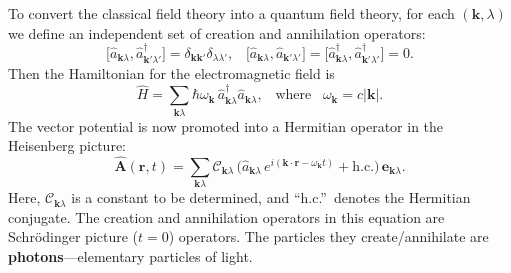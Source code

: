 \documentclass[pra,12pt]{revtex4}
\begin{document}
To convert the classical field theory into a quantum field theory, for
each $(\mathbf{k},\lambda)$ we define an independent set of creation
and annihilation operators:
\begin{equation}
  \big[\hat{a}_{\mathbf{k}\lambda}, \hat{a}_{\mathbf{k}'\lambda'}^\dagger\big]
  = \delta_{\mathbf{k}\mathbf{k}'} \delta_{\lambda\lambda'}, \;\;\;
  \big[\hat{a}_{\mathbf{k}\lambda}, \hat{a}_{\mathbf{k}'\lambda'}\big]
  = \big[\hat{a}_{\mathbf{k}\lambda}^\dagger, \hat{a}_{\mathbf{k}'\lambda'}^\dagger\big]
  = 0.
\end{equation}
Then the Hamiltonian for the electromagnetic field is
\begin{equation}
  \hat{H} = \sum_{\mathbf{k}\lambda} \hbar \omega_{\mathbf{k}} \,
  \hat{a}^\dagger_{\mathbf{k}\lambda} \hat{a}_{\mathbf{k}\lambda},
  \;\;\; \mathrm{where}
  \;\;\;\omega_{\mathbf{k}} = c|\mathbf{k}|.
\end{equation}
The vector potential is now promoted into a Hermitian operator in the
Heisenberg picture:
\begin{equation}
  \hat{\mathbf{A}}(\mathbf{r},t) = \sum_{\mathbf{k}\lambda} 
  \mathcal{C}_{\mathbf{k}\lambda}\,
  \Big(\hat{a}_{\mathbf{k}\lambda} \, e^{i(\mathbf{k}\cdot\mathbf{r} - \omega_{\mathbf{k}} t)}
  + \mathrm{h.c.}\Big)\, \mathbf{e}_{\mathbf{k}\lambda}.
  \label{Aquantum}
\end{equation}
Here, $\mathcal{C}_{\mathbf{k}\lambda}$ is a constant to be
determined, and ``h.c.''~denotes the Hermitian conjugate.  The
creation and annihilation operators in this equation are Schr\"odinger
picture ($t = 0$) operators.  The particles they create/annihilate are
\textbf{photons}---elementary particles of light.
\end{document}
